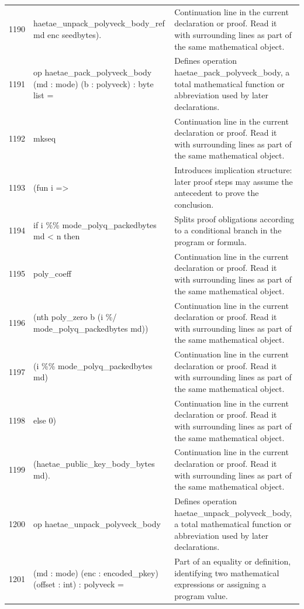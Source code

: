 \documentclass[10pt]{article}
\begin{document}
\begin{longtable}{r L{0.53\textwidth} L{0.37\textwidth}}
1190 & {\ttfamily\scriptsize    haetae\_unpack\_polyveck\_body\_ref md enc seedbytes).} & Continuation line in the current declaration or proof.  Read it with surrounding lines as part of the same mathematical object. \\
1191 & {\ttfamily\scriptsize op haetae\_pack\_polyveck\_body (md : mode) (b : polyveck) : byte list =} & Defines operation haetae\_pack\_polyveck\_body, a total mathematical function or abbreviation used by later declarations. \\
1192 & {\ttfamily\scriptsize   mkseq} & Continuation line in the current declaration or proof.  Read it with surrounding lines as part of the same mathematical object. \\
1193 & {\ttfamily\scriptsize     (fun i =>} & Introduces implication structure: later proof steps may assume the antecedent to prove the conclusion. \\
1194 & {\ttfamily\scriptsize       if i \%\% mode\_polyq\_packedbytes md < n then} & Splits proof obligations according to a conditional branch in the program or formula. \\
1195 & {\ttfamily\scriptsize         poly\_coeff} & Continuation line in the current declaration or proof.  Read it with surrounding lines as part of the same mathematical object. \\
1196 & {\ttfamily\scriptsize           (nth poly\_zero b (i \%/ mode\_polyq\_packedbytes md))} & Continuation line in the current declaration or proof.  Read it with surrounding lines as part of the same mathematical object. \\
1197 & {\ttfamily\scriptsize           (i \%\% mode\_polyq\_packedbytes md)} & Continuation line in the current declaration or proof.  Read it with surrounding lines as part of the same mathematical object. \\
1198 & {\ttfamily\scriptsize       else 0)} & Continuation line in the current declaration or proof.  Read it with surrounding lines as part of the same mathematical object. \\
1199 & {\ttfamily\scriptsize     (haetae\_public\_key\_body\_bytes md).} & Continuation line in the current declaration or proof.  Read it with surrounding lines as part of the same mathematical object. \\
1200 & {\ttfamily\scriptsize op haetae\_unpack\_polyveck\_body} & Defines operation haetae\_unpack\_polyveck\_body, a total mathematical function or abbreviation used by later declarations. \\
1201 & {\ttfamily\scriptsize    (md : mode) (enc : encoded\_pkey) (offset : int) : polyveck =} & Part of an equality or definition, identifying two mathematical expressions or assigning a program value. \\

\end{longtable}
\end{document}
